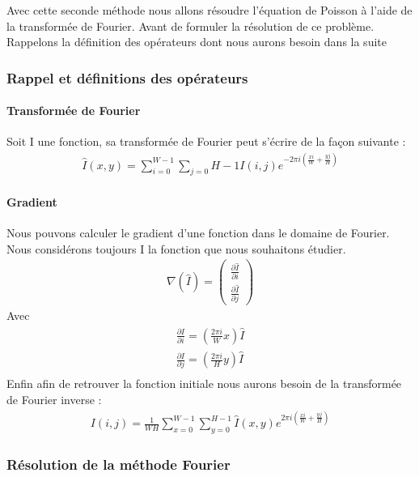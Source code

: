 Avec cette seconde méthode nous allons résoudre l'équation de Poisson à l'aide de la transformée de Fourier. Avant de formuler la résolution de ce problème. Rappelons la définition des opérateurs dont nous aurons besoin dans la suite
\subsubsection{Rappel et définitions des opérateurs}
\paragraph{Transformée de Fourier}
Soit I une fonction, sa transformée de Fourier peut s'écrire de la façon suivante : 
\begin{equation}
\begin{aligned}
\hat{I}(x,y) = \sum_{i = 0}^{W-1} \sum_{j = 0}{H-1} I(i,j) e^{-2\pi i\left(\frac{xi}{W}+\frac{yj}{H}\right)}
\end{aligned}
\end{equation}
\paragraph{Gradient}
Nous pouvons calculer le gradient d'une fonction dans le domaine de Fourier. Nous considérons toujours I la fonction que nous souhaitons étudier. 
\begin{equation}
\begin{aligned}
\nabla (\hat{I}) =
\begin{pmatrix}
\frac{\partial\hat{I}}{\partial i}\\
\frac{\partial \hat{I}}{\partial j}
\end{pmatrix}
\end{aligned}
\end{equation}
Avec 
\begin{equation}
\begin{aligned}
\frac{\partial \hat{I}}{\partial i} = \left(\frac{2\pi i}{W}x\right) \hat{I}\\
\frac{\partial \hat{I}}{\partial j} = \left(\frac{2\pi i}{H}y\right) \hat{I}\\
\end{aligned}
\end{equation}
Enfin afin de retrouver la fonction initiale nous aurons besoin de la transformée de Fourier inverse : 
\begin{equation}
\begin{aligned}
I(i,j) = \frac{1}{WH} \sum_{x = 0}^{W-1} \sum_{y = 0}^{H-1} \hat{I}(x,y) e^{2\pi i \left(\frac{xi}{W}+\frac{yj}{H}\right)}
\end{aligned}
\end{equation}

\subsubsection{Résolution de la méthode Fourier}